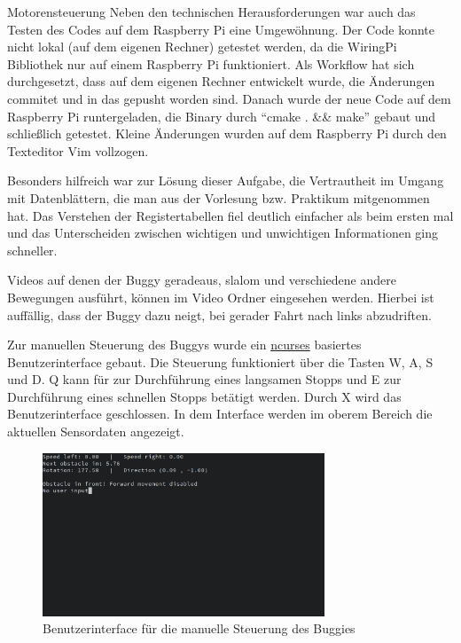 \documentclass[12pt]{report}
\begin{document}
\begin{section}{Motorensteuerung}
  Neben den technischen Herausforderungen war auch das Testen des Codes auf dem
  Raspberry Pi eine Umgewöhnung. Der Code konnte nicht lokal (auf dem eigenen
  Rechner) getestet werden, da die WiringPi Bibliothek nur auf einem Raspberry Pi funktioniert.
  Als Workflow hat sich durchgesetzt, dass auf dem eigenen Rechner entwickelt
  wurde, die Änderungen commitet und in das \githubrepo gepusht worden sind.
  Danach wurde der neue Code auf dem Raspberry Pi runtergeladen, die Binary
  durch ``cmake . \&\& make'' gebaut und schließlich getestet. Kleine Änderungen
  wurden auf dem Raspberry Pi durch den Texteditor Vim vollzogen.

  Besonders hilfreich war zur Lösung dieser Aufgabe, die Vertrautheit im Umgang
  mit Datenblättern, die man aus der Vorlesung bzw. Praktikum mitgenommen hat.
  Das Verstehen der Registertabellen fiel deutlich einfacher als beim ersten
  mal und das Unterscheiden zwischen wichtigen und unwichtigen Informationen
  ging schneller.


  Videos auf denen der Buggy geradeaus, slalom und verschiedene andere
  Bewegungen ausführt, können im Video Ordner eingesehen werden.
  Hierbei ist auffällig, dass der Buggy dazu neigt, bei gerader Fahrt nach links
  abzudriften.

  Zur manuellen Steuerung des Buggys wurde ein
  \href{https://en.wikipedia.org/wiki/Ncurses}{ncurses} basiertes
  Benutzerinterface gebaut. Die Steuerung funktioniert über die Tasten W, A, S
  und D. Q kann für zur Durchführung eines langsamen Stopps und E zur
  Durchführung eines schnellen Stopps betätigt werden. Durch X wird das
  Benutzerinterface geschlossen.
  In dem Interface werden im oberem Bereich die aktuellen Sensordaten angezeigt.

  \begin{figure}[h!]
    \centering
    \includegraphics[width=0.75\textwidth]{lernportfolio_assets/WasdBenutzerinterface.png}
    \caption{Benutzerinterface für die manuelle Steuerung des Buggies}
  \end{figure}

\end{section}
\end{document}

